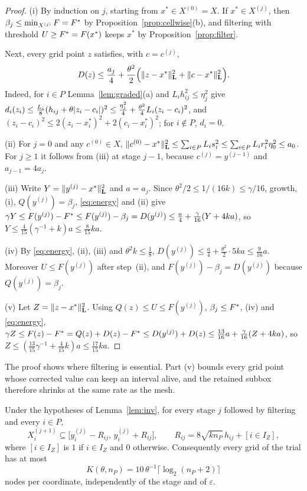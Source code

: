 \begin{proof}
(i) By induction on $j$, starting from $x^*\in X^{(0)}=X$. If
$x^*\in X^{(j)}$, then $\beta_j\le\min_{X^{(j)}}F=F^{*}$ by
Proposition~\ref{prop:cellwise}(b), and filtering with threshold
$U\ge F^{*}=F(x^*)$ keeps $x^*$ by Proposition~\ref{prop:filter}.

Next, every grid point $z$ satisfies, with $c=c^{(j)}$,
\begin{equation}\label{eq:energy}
D(z)\le\frac{a_j}4+\frac{\theta^2}2\Bigl(\lVert z-x^*\rVert_{\mathbf L}^2
+\lVert c-x^*\rVert_{\mathbf L}^2\Bigr).
\end{equation}
Indeed, for $i\in P$ Lemma~\ref{lem:graded}(a) and $L_ih_{ij}^2\le\eta_j^2$
give $d_i(z_i)\le\frac{L_i}8(h_{ij}+\theta\lvert z_i-c_i\rvert)^2\le\frac{\eta_j^2}4
+\frac{\theta^2}4L_i(z_i-c_i)^2$, and
$(z_i-c_i)^2\le2(z_i-x_i^*)^2+2(c_i-x_i^*)^2$; for $i\notin P$, $d_i=0$.

(ii) For $j=0$ and any $c^{(0)}\in X$,
$\lVert c^{(0)}-x^*\rVert_{\mathbf L}^2\le\sum_{i\in P}L_is_i^2\le
\sum_{i\in P}L_ir_i^2\eta_0^2\le a_0$. For $j\ge1$ it follows from (iii) at
stage $j-1$, because $c^{(j)}=y^{(j-1)}$ and $a_{j-1}=4a_j$.

(iii) Write $Y=\lVert y^{(j)}-x^*\rVert_{\mathbf L}^2$ and $a=a_j$. Since
$\theta^2/2\le1/(16k)\le\gamma/16$, growth, (i), $Q(y^{(j)})=\beta_j$,
\eqref{eq:energy} and (ii) give
$\gamma Y\le F(y^{(j)})-F^{*}\le F(y^{(j)})-\beta_j=D(y^{(j)})
\le\frac a4+\frac\gamma{16}(Y+4ka)$, so
$Y\le\frac4{15}(\gamma^{-1}+k)a\le\frac8{15}ka$.

(iv) By \eqref{eq:energy}, (ii), (iii) and $\theta^2k\le\frac18$,
$D(y^{(j)})\le\frac a4+\frac{\theta^2}2\cdot5ka\le\frac9{16}a$. Moreover
$U\le F(y^{(j)})$ after step~(ii), and $F(y^{(j)})-\beta_j=D(y^{(j)})$
because $Q(y^{(j)})=\beta_j$.

(v) Let $Z=\lVert z-x^*\rVert_{\mathbf L}^2$. Using $Q(z)\le U\le F(y^{(j)})$,
$\beta_j\le F^{*}$, (iv) and \eqref{eq:energy},
$\gamma Z\le F(z)-F^{*}=Q(z)+D(z)-F^{*}\le D(y^{(j)})+D(z)\le\frac{13}{16}a
+\frac\gamma{16}(Z+4ka)$, so
$Z\le(\frac{13}{15}\gamma^{-1}+\frac4{15}k)a\le\frac{17}{15}ka$.
\end{proof}

The proof shows where filtering is essential. Part (v) bounds every grid point
whose corrected value can keep an interval alive, and the retained subbox
therefore shrinks at the same rate as the mesh.

\begin{lemma}\label{lem:states}
Under the hypotheses of Lemma~\ref{lem:inv}, for every stage $j$ followed by
filtering and every $i\in P$,
\[
X_i^{(j+1)}\subseteq\bigl[y_i^{(j)}-R_{ij},\,y_i^{(j)}+R_{ij}\bigr],\qquad
R_{ij}=8\sqrt{kn_P}\,h_{ij}+[i\in I_Z],
\]
where $[i\in I_Z]$ is $1$ if $i\in I_Z$ and $0$ otherwise. Consequently
every grid of the trial has at most
\begin{equation}\label{eq:statecap}
K(\theta,n_P)=10\,\theta^{-1}\lceil\log_2(n_P+2)\rceil
\end{equation}
nodes per coordinate, independently of the stage and of $\varepsilon$.
\end{lemma}

